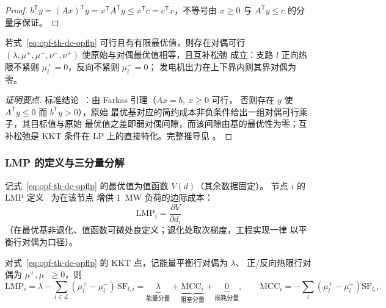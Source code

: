 \begin{proof}
$b^{\mathsf T}y=(Ax)^{\mathsf T}y=x^{\mathsf T}A^{\mathsf T}y
\le x^{\mathsf T}c=c^{\mathsf T}x$，不等号由 $x\ge0$ 与
$A^{\mathsf T}y\le c$ 的分量序保证。
\end{proof}

\begin{theorem}[LP 强对偶]\label{thm:opf-th-dc-strong}
若式~\eqref{eq:opf-th-dc-opflp} 可行且有有限最优值，则存在对偶可行
$(\lambda,\mu^+,\mu^-,\nu^-,\nu^+)$ 使原始与对偶最优值相等，且互补松弛
成立：支路 $l$ 正向热限不紧则 $\mu^+_l=0$，反向不紧则 $\mu^-_l=0$；
发电机出力在上下界内则其界对偶为零。
\end{theorem}

\begin{proof}[证明要点]
标准结论~\cite{opfdc:bertsimas}：由 Farkas 引理（$Ax=b,\ x\ge0$ 可行，
否则存在 $y$ 使 $A^{\mathsf T}y\le0$ 而 $b^{\mathsf T}y>0$），原始
最优基对应的简约成本非负条件给出一组对偶可行乘子，其目标值与原始
最优值之差即弱对偶间隙，而该间隙由基的最优性为零；互补松弛是
KKT 条件在 LP 上的直接特化。完整推导见
\cite{opfdc:bertsimas,opfdc:nemhauser-wolsey}。
\end{proof}

\subsubsection{LMP 的定义与三分量分解}

\begin{definition}[节点边际电价]\label{def:opf-th-dc-lmpdef}
记式~\eqref{eq:opf-th-dc-opflp} 的最优值为值函数 $V(d)$（其余数据固定）。
节点 $i$ 的 LMP 定义~\cite{opfdc:schweppe-spot,opfdc:hogan} 为在该节点
增供 $1$~MW 负荷的边际成本：
\begin{equation}
\mathrm{LMP}_i=\frac{\partial V}{\partial d_i}
\label{eq:opf-th-dc-lmpdef}
\end{equation}
（在最优基非退化、值函数可微处良定义；退化处取次梯度，工程实现一律
以平衡行对偶为口径）。
\end{definition}

\begin{theorem}\label{thm:opf-th-dc-lmpdecomp}
对式~\eqref{eq:opf-th-dc-opflp} 的 KKT 点，记能量平衡行对偶为 $\lambda$、
正/反向热限行对偶为 $\mu^+,\mu^-\ge0$，则
\begin{equation}
\mathrm{LMP}_i=\lambda
-\sum_{l\in\mathcal L}(\mu^+_l-\mu^-_l)\,\mathrm{SF}_{l,i}
=\underbrace{\lambda}_{\text{能量分量}}
+\underbrace{\mathrm{MCC}_i}_{\text{阻塞分量}}
+\underbrace{0}_{\text{损耗分量}},
\qquad \mathrm{MCC}_i=-\sum_l(\mu^+_l-\mu^-_l)\mathrm{SF}_{l,i}.
\label{eq:opf-th-dc-lmpdecomp}
\end{equation}
\end{theorem}

